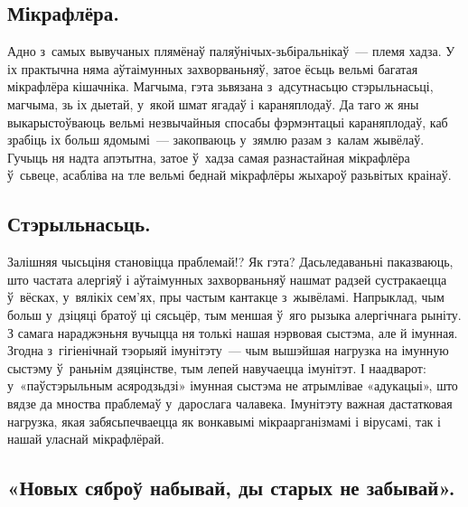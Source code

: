\subsection*{Мікрафлёра.}

Адно з~самых вывучаных плямёнаў паляўнічых-зьбі\-раль\-ні\-каў~--- племя хадза. У іх практычна няма аўтаімунных захворваньняў, затое ёсьць вельмі багатая мікрафлёра кішачніка. Магчыма, гэта зьвязана з~адсутнасьцю стэрыльнасьці, магчыма, зь іх дыетай, у~якой шмат ягадаў і караняплодаў. Да таго ж яны выкарыстоўваюць вельмі незвычайныя спосабы фэрмэнтацыі караняплодаў, каб зрабіць іх больш ядомымі~--- закопваюць у~зямлю разам з~калам жывёлаў. Гучыць ня надта апэтытна, затое ў~хадза самая разнастайная мікрафлёра ў~сьвеце, асабліва на тле вельмі беднай мікрафлёры жыхароў разьвітых краінаў.

\subsection*{Стэрыльнасьць.}

Залішняя чысьціня становіцца праблемай!? Як гэта? Дасьледаваньні паказваюць, што частата алергіяў і аўтаімунных захворваньняў нашмат радзей сустракаецца ў~вёсках, у~вялікіх сем'ях, пры частым кантакце з~жывёламі. Напрыклад, чым больш у~дзіцяці братоў ці сясьцёр, тым меншая ў~яго рызыка алергічнага рыніту. З самага нараджэньня вучыцца ня толькі нашая нэрвовая сыстэма, але й імунная. Згодна з~гігіенічнай тэорыяй імунітэту~--- чым вышэйшая нагрузка на імунную сыстэму ў~раньнім дзяцінстве, тым лепей навучаецца імунітэт. І наадварот: у~«паўстэрыльным асяродзьдзі» імунная сыстэма не атрымлівае «адукацыі», што вядзе да мноства праблемаў у~дарослага чалавека. Імунітэту важная дастатковая нагрузка, якая забясьпечваецца як вонкавымі мікраарганізмамі і вірусамі, так і нашай уласнай мікрафлёрай. 



\subsection*{«Новых сяброў набывай, ды старых не забывай».}

